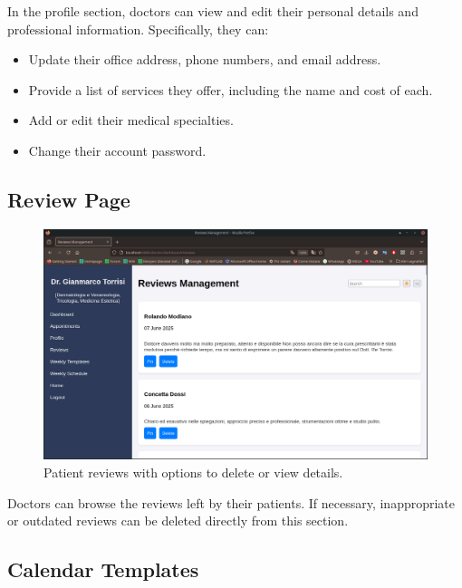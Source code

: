 In the profile section, doctors can view and edit their personal details and professional information. Specifically, they can:
\begin{itemize}
    \item Update their office address, phone numbers, and email address.
    \item Provide a list of services they offer, including the name and cost of each.
    \item Add or edit their medical specialties.
    \item Change their account password.
\end{itemize}

\subsection{Review Page}

\begin{figure}[!h]
    \centering
    \includegraphics[scale=0.30]{resources/screenshots/doctor_ui/reviews.png}
    \caption{Patient reviews with options to delete or view details.}
    \label{fig:patient_reviews}
\end{figure}

Doctors can browse the reviews left by their patients. If necessary, inappropriate or outdated reviews can be deleted directly from this section.

\subsection{Calendar Templates}

